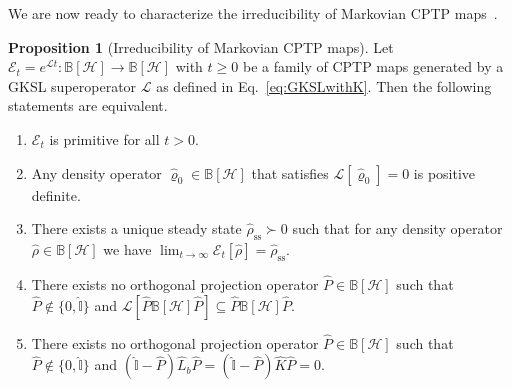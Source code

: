\documentclass[preprint,pteplogo]{ptephy_v2}%
\numberwithin{equation}{section}
\theoremstyle{definition}
\newtheorem{proposition}[theorem]{Proposition}
\newcommand{\mc}[1]{\mathcal{#1}}
\newcommand{\mbb}[1]{\mathbb{#1}}
\begin{document}
We are now ready to characterize the irreducibility of Markovian CPTP maps~\cite{wolf2012quantum}.

\begin{proposition}[Irreducibility of Markovian CPTP maps]
\label{prop:IrreducibleMarkovCPTP}
Let $\mc{E}_t = e^{\mc{L}t}: \mbb{B}[\mc{H}] \to \mbb{B}[\mc{H}]$ with $t \geq 0$ be a family of CPTP maps generated by a GKSL superoperator $\mathcal{L}$ as defined in Eq.~\eqref{eq:GKSLwithK}.
Then the following statements are equivalent.
\begin{enumerate}
\item $\mc{E}_t$ is primitive for all $t>0$.
\item Any density operator $\hat{\varrho}_0 \in \mbb{B}[\mc{H}]$ that satisfies $\mc{L}[\hat{\varrho}_0]=0$ is positive definite.
\item There exists a unique steady state $\hat{\rho}_\mathrm{ss} \succ 0$ such that for any density operator $\hat{\rho} \in \mbb{B}[\mc{H}]$ we have $\lim_{t \to \infty} \mc{E}_t [\hat{\rho}] = \hat{\rho}_\mathrm{ss}$.
\item There exists no orthogonal projection operator $\hat{P} \in \mbb{B}[\mc{H}]$ such that $\hat{P} \notin \{ 0, \hat{\mbb{I}} \}$ and $\mc{L}[\hat{P}\mbb{B}[\mc{H}]\hat{P}] \subseteq \hat{P} \mbb{B}[\mc{H}] \hat{P}$.
\item There exists no orthogonal projection operator $\hat{P} \in \mbb{B}[\mc{H}]$ such that $\hat{P} \notin \{ 0, \hat{\mbb{I}} \}$ and $(\hat{\mbb{I}}-\hat{P}) \hat{L}_b \hat{P} = (\hat{\mbb{I}}-\hat{P}) \hat{K} \hat{P} = 0$.
\end{enumerate}
\end{proposition}
\end{document}

